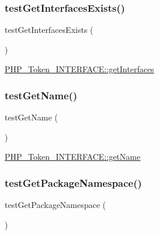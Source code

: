 \subsubsection{\texorpdfstring{test\+Get\+Interfaces\+Exists()}{testGetInterfacesExists()}}
{\footnotesize\ttfamily test\+Get\+Interfaces\+Exists (\begin{DoxyParamCaption}{ }\end{DoxyParamCaption})}

\mbox{\hyperlink{class_p_h_p___token___i_n_t_e_r_f_a_c_e_aacd41ad982fee4953d8ad245ab7e4ec9}{P\+H\+P\+\_\+\+Token\+\_\+\+I\+N\+T\+E\+R\+F\+A\+C\+E\+::get\+Interfaces}} \mbox{\label{class_p_h_p___token___interface_test_a20d1601e22a17dad9eb8c9050676ef70}} 
\subsubsection{\texorpdfstring{test\+Get\+Name()}{testGetName()}}
{\footnotesize\ttfamily test\+Get\+Name (\begin{DoxyParamCaption}{ }\end{DoxyParamCaption})}

\mbox{\hyperlink{class_p_h_p___token___i_n_t_e_r_f_a_c_e_a3d0963e68bb313b163a73f2803c64600}{P\+H\+P\+\_\+\+Token\+\_\+\+I\+N\+T\+E\+R\+F\+A\+C\+E\+::get\+Name}} \mbox{\label{class_p_h_p___token___interface_test_a62fdb5f6ee04537965defac169844269}} 
\subsubsection{\texorpdfstring{test\+Get\+Package\+Namespace()}{testGetPackageNamespace()}}
{\footnotesize\ttfamily test\+Get\+Package\+Namespace (\begin{DoxyParamCaption}{ }\end{DoxyParamCaption})}

